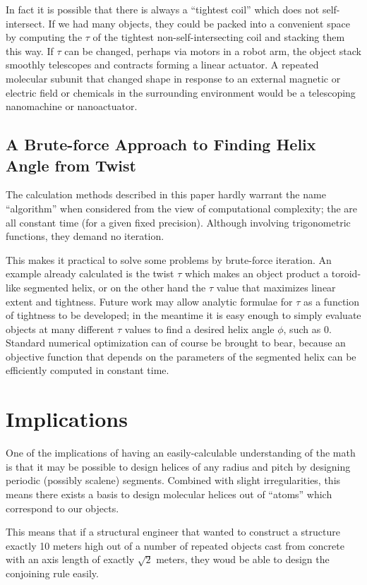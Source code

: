 \documentclass[11pt]{article}
\begin{document}
{In fact it is possible that there is always a ``tightest coil''
which does not self-intersect. If we had many objects,
they could be packed into a convenient space by computing the $\tau$
of the tightest non-self-intersecting coil and stacking them this way.
If $\tau$ can be changed, perhaps via motors in a robot arm,
the object stack smoothly telescopes and contracts forming a
linear actuator.
A repeated molecular subunit that changed shape in
response to an external magnetic or electric field or chemicals in the surrounding
environment would be a telescoping nanomachine or nanoactuator.


\subsection{A Brute-force Approach to Finding Helix Angle from Twist}

The calculation methods described in this paper hardly warrant the name ``algorithm'' when considered from the view of computational complexity;
the are all constant time (for a given fixed precision).
Although involving trigonometric functions, they demand no iteration.

This makes it practical to solve some problems by brute-force iteration.
An example already calculated is the twist $\tau$ which makes
an object product a toroid-like segmented helix, or on the other hand
the $\tau$ value that maximizes linear extent and tightness.
Future work may allow analytic formulae for $\tau$ as a function of
tightness to be developed; in the meantime it is easy enough
to simply evaluate objects at many different $\tau$ values to find a
desired helix angle $\phi$, such as $0$.
Standard numerical optimization can of course be brought to bear, because an objective function
that depends on the parameters of the segmented helix can
be efficiently computed in constant time.

\section{Implications}

One of the implications of having an easily-calculable understanding of the math
is that it may be possible to design helices
of any radius and pitch by designing periodic (possibly scalene) segments.
Combined with slight
irregularities, this means there exists a basis to design molecular helices
out of ``atoms'' which correspond to our objects.

This means that if a structural engineer that wanted to construct a structure exactly 10 meters high
out of a number of repeated objects cast from concrete with an axis length of  exactly $\sqrt{2}$ meters,
they woud be able to design the conjoining rule easily.

}
\end{document}
